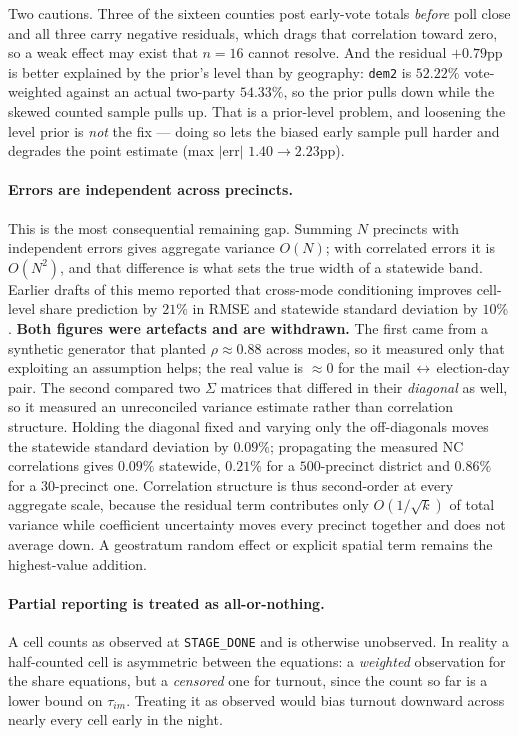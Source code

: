 \documentclass[11pt]{article}
\begin{document}
Two cautions. Three of the sixteen counties post early-vote totals \emph{before} poll
close and all three carry negative residuals, which drags that correlation toward zero, so
a weak effect may exist that $n=16$ cannot resolve. And the residual $+0.79$pp is better
explained by the prior's level than by geography: \texttt{dem2} is $52.22\%$ vote-weighted
against an actual two-party $54.33\%$, so the prior pulls down while the skewed counted
sample pulls up. That is a prior-level problem, and loosening the level prior is
\emph{not} the fix --- doing so lets the biased early sample pull harder and degrades the
point estimate (max $|\textrm{err}|$ $1.40 \to 2.23$pp).

\paragraph{Errors are independent across precincts.} This is the most consequential
remaining gap. Summing $N$ precincts with independent errors gives aggregate variance
$O(N)$; with correlated errors it is $O(N^2)$, and that difference is what sets the true
width of a statewide band. Earlier drafts of this memo reported that cross-mode conditioning
improves cell-level share prediction by $21\%$ in RMSE and statewide standard deviation by
$10\%$. \textbf{Both figures were artefacts and are withdrawn.} The first came from a
synthetic generator that planted $\rho \approx 0.88$ across modes, so it measured only that
exploiting an assumption helps; the real value is $\approx 0$ for the
mail\,$\leftrightarrow$\,election-day pair. The second compared two $\Sigma$ matrices that
differed in their \emph{diagonal} as well, so it measured an unreconciled variance estimate
rather than correlation structure. Holding the diagonal fixed and varying only the
off-diagonals moves the statewide standard deviation by $0.09\%$; propagating the measured
NC correlations gives $0.09\%$ statewide, $0.21\%$ for a $500$-precinct district and
$0.86\%$ for a $30$-precinct one. Correlation structure is thus second-order at every
aggregate scale, because the residual term contributes only $O(1/\sqrt{k})$ of total
variance while coefficient uncertainty moves every precinct together and does not average
down. A geostratum random effect or explicit spatial term remains the highest-value
addition.

\paragraph{Partial reporting is treated as all-or-nothing.} A cell counts as observed at
\texttt{STAGE\_DONE} and is otherwise unobserved. In reality a half-counted cell is
asymmetric between the equations: a \emph{weighted} observation for the share equations,
but a \emph{censored} one for turnout, since the count so far is a lower bound on
$\tau_{im}$. Treating it as observed would bias turnout downward across nearly every cell
early in the night.
\end{document}
